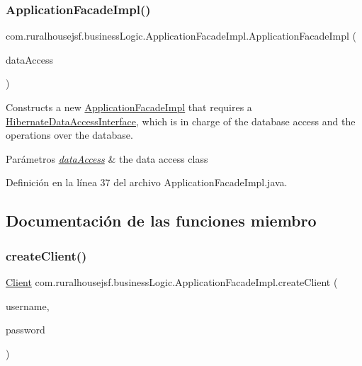 \subsubsection{\texorpdfstring{ApplicationFacadeImpl()}{ApplicationFacadeImpl()}}
{\footnotesize\ttfamily com.\+ruralhousejsf.\+business\+Logic.\+Application\+Facade\+Impl.\+Application\+Facade\+Impl (\begin{DoxyParamCaption}\item[{\mbox{\hyperlink{a00148}{Hibernate\+Data\+Access\+Interface}}}]{data\+Access }\end{DoxyParamCaption})}



Constructs a new \mbox{\hyperlink{a00132}{Application\+Facade\+Impl}} that requires a \mbox{\hyperlink{}{Hibernate\+Data\+Access\+Interface}}, which is in charge of the database access and the operations over the database. 


\begin{DoxyParams}{Parámetros}
{\em \mbox{\hyperlink{a00112}{data\+Access}}} & the data access class \\
\hline
\end{DoxyParams}


Definición en la línea 37 del archivo Application\+Facade\+Impl.\+java.



\subsection{Documentación de las funciones miembro}
\mbox{\label{a00132_ae48e63f3df5226e46e4a57a64d120823}} 
\subsubsection{\texorpdfstring{createClient()}{createClient()}}
{\footnotesize\ttfamily \mbox{\hyperlink{a00164}{Client}} com.\+ruralhousejsf.\+business\+Logic.\+Application\+Facade\+Impl.\+create\+Client (\begin{DoxyParamCaption}\item[{String}]{username,  }\item[{String}]{password }\end{DoxyParamCaption})}



